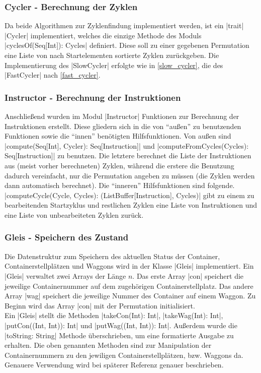 \subsubsection{Cycler - Berechnung der Zyklen}
Da beide Algorithmen zur Zyklenfindung implementiert werden, ist ein |trait| |Cycler| implementiert,
welches die einzige Methode des Moduls |cyclesOf(Seq[Int]): Cycles| definiert.
Diese soll zu einer gegebenen Permutation eine Liste von nach Startelementen sortierte Zyklen zurückgeben.
Die Implementierung des |SlowCycler| erfolgte wie in \ref{slow_cycler}, die des |FastCycler| nach \ref{fast_cycler}.

\subsubsection{Instructor - Berechnung der Instruktionen}
Anschließend wurden im Modul |Instructor| Funktionen zur Berechnung der Instruktionen erstellt.
Diese gliedern sich in die von ``außen'' zu benutzenden Funktionen sowie die ``innen'' benötigten Hilfsfunktionen.
Von außen sind |compute(Seq[Int], Cycler): Seq[Instruction]| und |computeFromCycles(Cycles): Seq[Instruction]| zu benutzen.
Die letztere berechnet die Liste der Instruktionen aus (meist vorher berechneten) Zyklen,
während die erstere die Benutzung dadurch vereinfacht, nur die Permutation angeben zu müssen (die Zyklen werden dann automatisch berechnet).
Die ``inneren'' Hilfsfunktionen sind folgende. \\
|computeCycle(Cycle, Cycles): (ListBuffer[Instruction], Cycles)|
gibt zu einem zu bearbeitenden Startzyklus und restlichen Zyklen eine Liste von Instruktionen und eine Liste von unbearbeiteten Zyklen zurück.

\subsubsection{Gleis - Speichern des Zustand}
\label{gleis}
Die Datenstruktur zum Speichern des aktuellen Status der Container, Containerstellplätzen und Waggons wird in der Klasse |Gleis| implementiert.
Ein |Gleis| verwaltet zwei Arrays der Länge $n$. Das erste Array |con| speichert die jeweilige Containernummer auf dem zugehörigen Containerstellplatz.
Das andere Array |wag| speichert die jeweilige Nummer des Container auf einem Waggon.
Zu Beginn wird das Array |con| mit der Permutation initialisiert. \\
Ein |Gleis| stellt die Methoden |takeCon(Int): Int|,\- |takeWag(Int): Int|,\- |putCon((Int, Int)): Int| und |putWag((Int, Int)): Int|.
Außerdem wurde die |toString: String| Methode über\-schrie\-ben, um eine formatierte Ausgabe zu erhalten.
Die oben genannten Methoden sind zur Manipulation der Containernummern zu den jewiligen Containerstellplätzen, bzw. Waggons da.
Genauere Verwendung wird bei späterer Referenz genauer beschrieben.


